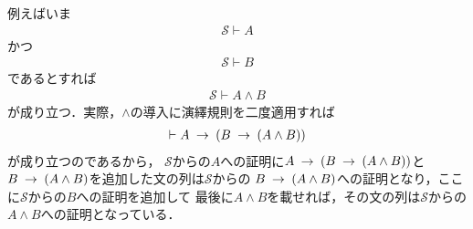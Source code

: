 	例えばいま
	\begin{align}
		\mathscr{S} \vdash A
	\end{align}
	かつ
	\begin{align}
		\mathscr{S} \vdash B
	\end{align}
	であるとすれば
	\begin{align}
		\mathscr{S} \vdash A \wedge B
	\end{align}
	が成り立つ．実際，$\wedge$の導入に演繹規則を二度適用すれば
	\begin{align}
		\vdash A \hspace{0.25em}\rightarrow\hspace{0.25em} (B \hspace{0.25em}\rightarrow\hspace{0.25em} (A \wedge B))
	\end{align}
	が成り立つのであるから，
	$\mathscr{S}$からの$A$への証明に$A \hspace{0.25em}\rightarrow\hspace{0.25em} (B \hspace{0.25em}\rightarrow\hspace{0.25em} (A \wedge B))$と
	$B \hspace{0.25em}\rightarrow\hspace{0.25em} (A \wedge B)$を追加した文の列は$\mathscr{S}$からの
	$B \hspace{0.25em}\rightarrow\hspace{0.25em} (A \wedge B)$への証明となり，ここに$\mathscr{S}$からの$B$への証明を追加して
	最後に$A \wedge B$を載せれば，その文の列は$\mathscr{S}$からの$A \wedge B$への証明となっている．